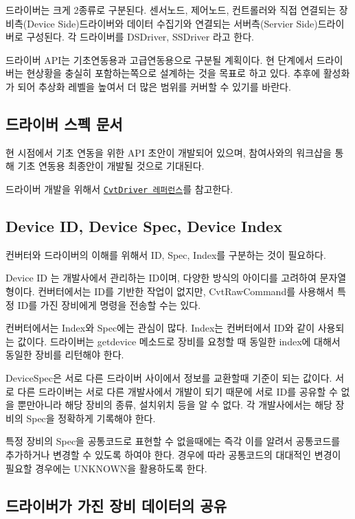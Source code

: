 드라이버는 크게 2종류로 구분된다. 센서노드, 제어노드, 컨트롤러와 직접 연결되는 장비측(\+Device Side)드라이버와 데이터 수집기와 연결되는 서버측(\+Servier Side)드라이버로 구성된다. 각 드라이버를 D\+S\+Driver, S\+S\+Driver 라고 한다.

드라이버 A\+P\+I는 기초연동용과 고급연동용으로 구분될 계획이다. 현 단계에서 드라이버는 현상황을 충실히 포함하는쪽으로 설계하는 것을 목표로 하고 있다. 추후에 활성화가 되어 추상화 레벨을 높여서 더 많은 범위를 커버할 수 있기를 바란다.

\subsection*{드라이버 스펙 문서}

현 시점에서 기초 연동을 위한 A\+PI 초안이 개발되어 있으며, 참여사와의 워크샵을 통해 기초 연동용 최종안이 개발될 것으로 기대된다.

드라이버 개발을 위해서 \href{https://ebio-snu.github.io/cvtdriver/}{\tt Cvt\+Driver 레퍼런스}를 참고한다.

\subsection*{Device ID, Device Spec, Device Index}

컨버터와 드라이버의 이해를 위해서 ID, Spec, Index를 구분하는 것이 필요하다.

Device ID 는 개발사에서 관리하는 I\+D이며, 다양한 방식의 아이디를 고려하여 문자열 형이다. 컨버터에서는 I\+D를 기반한 작업이 없지만, Cvt\+Raw\+Command를 사용해서 특정 I\+D를 가진 장비에게 명령을 전송할 수는 있다.

컨버터에서는 Index와 Spec에는 관심이 많다. Index는 컨버터에서 I\+D와 같이 사용되는 값이다. 드라이버는 getdevice 메소드로 장비를 요청할 때 동일한 index에 대해서 동일한 장비를 리턴해야 한다.

Device\+Spec은 서로 다른 드라이버 사이에서 정보를 교환할때 기준이 되는 값이다. 서로 다른 드라이버는 서로 다른 개발사에서 개발이 되기 때문에 서로 I\+D를 공유할 수 없을 뿐만아니라 해당 장비의 종류, 설치위치 등을 알 수 없다. 각 개발사에서는 해당 장비의 Spec을 정확하게 기록해야 한다.

특정 장비의 Spec을 공통코드로 표현할 수 없을때에는 즉각 이를 알려서 공통코드를 추가하거나 변경할 수 있도록 하여야 한다. 경우에 따라 공통코드의 대대적인 변경이 필요할 경우에는 U\+N\+K\+N\+O\+W\+N을 활용하도록 한다.

\subsection*{드라이버가 가진 장비 데이터의 공유}

